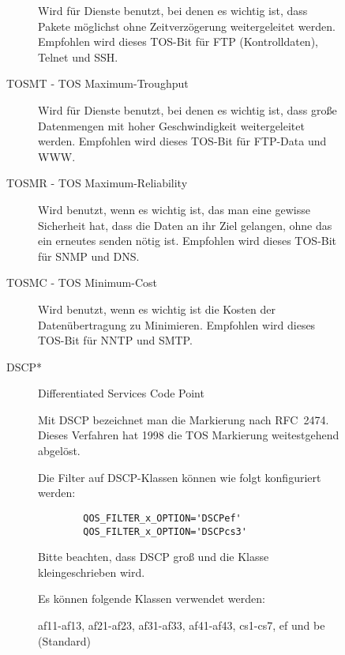 \begin{description}
\begin{description}
\begin{description}
   Wird für Dienste benutzt, bei denen es wichtig ist, dass Pakete
   möglichst ohne Zeitverzögerung weitergeleitet werden. Empfohlen wird
   dieses TOS-Bit für FTP (Kontrolldaten), Telnet und SSH.


 \item[TOSMT - TOS Maximum-Troughput]

   Wird für Dienste benutzt, bei denen es wichtig ist, dass große
   Datenmengen mit hoher Geschwindigkeit weitergeleitet werden. Empfohlen
   wird dieses TOS-Bit für FTP-Data und WWW.


 \item[TOSMR - TOS Maximum-Reliability]

   Wird benutzt, wenn es wichtig ist, das man eine gewisse Sicherheit
   hat, dass die Daten an ihr Ziel gelangen, ohne das ein erneutes senden
   nötig ist. Empfohlen wird dieses TOS-Bit für SNMP und DNS.


 \item[TOSMC - TOS Minimum-Cost]

   Wird benutzt, wenn es wichtig ist die Kosten der Datenübertragung zu
   Minimieren. Empfohlen wird dieses TOS-Bit für NNTP und SMTP.

 \item[DSCP*] Differentiated Services Code Point

   Mit DSCP bezeichnet man die Markierung nach RFC\ 2474.
   Dieses Verfahren hat 1998 die TOS Markierung weitestgehend abgelöst.

   Die Filter auf DSCP-Klassen können wie folgt konfiguriert werden:

\begin{example}
\begin{verbatim}
        QOS_FILTER_x_OPTION='DSCPef'
        QOS_FILTER_x_OPTION='DSCPcs3'
\end{verbatim}
\end{example}

   Bitte beachten, dass DSCP groß und die Klasse kleingeschrieben wird.

   Es können folgende Klassen verwendet werden:

   af11-af13, af21-af23, af31-af33, af41-af43, cs1-cs7, ef und be (Standard)

 \end{description}
\end{description}
\end{description}





